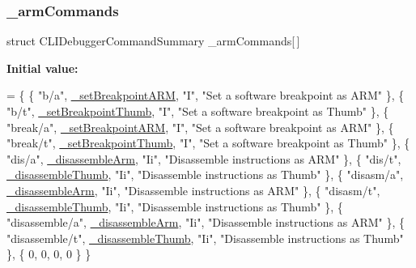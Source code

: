 \subsubsection{\texorpdfstring{\+\_\+arm\+Commands}{\_armCommands}}
{\footnotesize\ttfamily struct C\+L\+I\+Debugger\+Command\+Summary \+\_\+arm\+Commands\mbox{[}$\,$\mbox{]}\hspace{0.3cm}{\ttfamily [static]}}

{\bfseries Initial value\+:}
\begin{DoxyCode}
= \{
    \{ \textcolor{stringliteral}{"b/a"}, \mbox{\hyperlink{arm_2debugger_2cli-debugger_8c_ae37b285f8c652414bf1f0aafa2d4909b}{\_setBreakpointARM}}, \textcolor{stringliteral}{"I"}, \textcolor{stringliteral}{"Set a software breakpoint as ARM"} \},
    \{ \textcolor{stringliteral}{"b/t"}, \mbox{\hyperlink{arm_2debugger_2cli-debugger_8c_acad8c99d24d754d1ff65c79fdb18cf0e}{\_setBreakpointThumb}}, \textcolor{stringliteral}{"I"}, \textcolor{stringliteral}{"Set a software breakpoint as Thumb"} \},
    \{ \textcolor{stringliteral}{"break/a"}, \mbox{\hyperlink{arm_2debugger_2cli-debugger_8c_ae37b285f8c652414bf1f0aafa2d4909b}{\_setBreakpointARM}}, \textcolor{stringliteral}{"I"}, \textcolor{stringliteral}{"Set a software breakpoint as ARM"} \},
    \{ \textcolor{stringliteral}{"break/t"}, \mbox{\hyperlink{arm_2debugger_2cli-debugger_8c_acad8c99d24d754d1ff65c79fdb18cf0e}{\_setBreakpointThumb}}, \textcolor{stringliteral}{"I"}, \textcolor{stringliteral}{"Set a software breakpoint as Thumb"} \},
    \{ \textcolor{stringliteral}{"dis/a"}, \mbox{\hyperlink{arm_2debugger_2cli-debugger_8c_ab0bbaa1e92b7c34f955f91a60e2bce71}{\_disassembleArm}}, \textcolor{stringliteral}{"Ii"}, \textcolor{stringliteral}{"Disassemble instructions as ARM"} \},
    \{ \textcolor{stringliteral}{"dis/t"}, \mbox{\hyperlink{arm_2debugger_2cli-debugger_8c_ae4976961ac2fc2199fc3fd2ad59f368c}{\_disassembleThumb}}, \textcolor{stringliteral}{"Ii"}, \textcolor{stringliteral}{"Disassemble instructions as Thumb"} \},
    \{ \textcolor{stringliteral}{"disasm/a"}, \mbox{\hyperlink{arm_2debugger_2cli-debugger_8c_ab0bbaa1e92b7c34f955f91a60e2bce71}{\_disassembleArm}}, \textcolor{stringliteral}{"Ii"}, \textcolor{stringliteral}{"Disassemble instructions as ARM"} \},
    \{ \textcolor{stringliteral}{"disasm/t"}, \mbox{\hyperlink{arm_2debugger_2cli-debugger_8c_ae4976961ac2fc2199fc3fd2ad59f368c}{\_disassembleThumb}}, \textcolor{stringliteral}{"Ii"}, \textcolor{stringliteral}{"Disassemble instructions as Thumb"} \},
    \{ \textcolor{stringliteral}{"disassemble/a"}, \mbox{\hyperlink{arm_2debugger_2cli-debugger_8c_ab0bbaa1e92b7c34f955f91a60e2bce71}{\_disassembleArm}}, \textcolor{stringliteral}{"Ii"}, \textcolor{stringliteral}{"Disassemble instructions as ARM"} \},
    \{ \textcolor{stringliteral}{"disassemble/t"}, \mbox{\hyperlink{arm_2debugger_2cli-debugger_8c_ae4976961ac2fc2199fc3fd2ad59f368c}{\_disassembleThumb}}, \textcolor{stringliteral}{"Ii"}, \textcolor{stringliteral}{"Disassemble instructions as Thumb"} \},
    \{ 0, 0, 0, 0 \}
\}
\end{DoxyCode}
